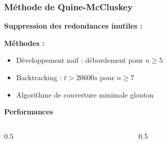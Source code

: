 \documentclass[handout]{beamer}
\begin{document}
\begin{frame}
  \frametitle{Méthode de Quine-McCluskey}
  \textbf{Suppression des redondances inutiles : }
   \vfill\null  
  \begin{tikzpicture}[scale=2]
  
  \end{tikzpicture}  
  \vfill\null  
  
  \par
  \textbf{Méthodes :}
  \begin{itemize}
  	\item Développement naïf : débordement pour $n\geq 5$
  	\item Backtracking : $t>20600s$ pour $n\geq 7$
  	\item Algorithme de couverture minimale glouton
  \end{itemize} 
  \vfill\null 
  
  \textbf{Performances}
  \par
  \begin{columns}
  	  \begin{column}[t]{0.5\hsize}
	  \begin{tikzpicture}[scale=0.8]
	  
	  \end{tikzpicture}
	  \end{column}
	  
	  \begin{column}[t]{0.5\hsize}
	  \begin{tikzpicture}[scale=0.8]
	  
	  \end{tikzpicture}
	  \end{column}
	\end{columns}
	  
%  
%    
%
%
\end{frame}
\end{document}
